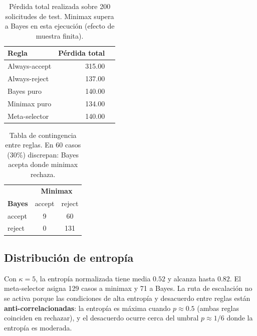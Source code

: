 \documentclass[11pt,a4paper]{article}
\theoremstyle{definition}
\begin{document}
\begin{table}[h]
	\centering
	\begin{tabular}{lrc}
		\toprule
		\textbf{Regla} & \textbf{Pérdida total} \\ \midrule
		Always-accept  & 315.00                 \\
		Always-reject  & 137.00                 \\
		Bayes puro     & 140.00                 \\
		Minimax puro   & 134.00                 \\
		Meta-selector  & 140.00                 \\ \bottomrule
	\end{tabular}
	\caption{Pérdida total realizada sobre 200 solicitudes de test.
		Minimax supera a Bayes en esta ejecución (efecto de muestra finita).}
	\label{tab:loss}
\end{table}

\begin{table}[h]
	\centering
	\begin{tabular}{lcc}
		\toprule
		               & \multicolumn{2}{c}{\textbf{Minimax}}          \\
		\textbf{Bayes} & accept                               & reject \\ \midrule
		accept         & 9                                    & 60     \\
		reject         & 0                                    & 131    \\ \bottomrule
	\end{tabular}
	\caption{Tabla de contingencia entre reglas. En 60 casos (30\%)
		discrepan: Bayes acepta donde minimax rechaza.}
	\label{tab:confusion}
\end{table}

\subsection*{Distribución de entropía}

Con $\kappa=5$, la entropía normalizada tiene media $0.52$ y alcanza hasta
$0.82$. El meta-selector asigna 129 casos a minimax y 71 a Bayes. La ruta
de escalación no se activa porque las condiciones de alta entropía y
desacuerdo entre reglas están \textbf{anti-correlacionadas}: la entropía
es máxima cuando $p\approx 0.5$ (ambas reglas coinciden en rechazar), y
el desacuerdo ocurre cerca del umbral $p\approx 1/6$ donde la entropía es
moderada.

\end{document}
